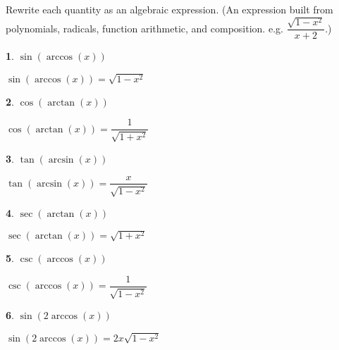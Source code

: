 \documentclass{amsbook}
\newtheorem{exc}{}
\newenvironment{ex}{\begin{exc}\normalfont}{\end{exc}}
\numberwithin{section}{chapter}
\numberwithin{equation}{chapter}
\begin{document}
Rewrite each quantity as an algebraic expression. (An expression built from polynomials, radicals, function arithmetic, and composition. e.g. $ \dfrac{\sqrt{1-x^2}}{x+2} $.)

\begin{multicols}{2}

\begin{ex}
	$\sin \left( \arccos \left( x \right) \right)$ 
	\begin{sol}
		$\sin \left( \arccos \left( x \right) \right) = \sqrt{1 - x^{2}}$ 
	\end{sol}
\end{ex}


\begin{ex}
	$\cos \left( \arctan \left( x \right) \right)$
	\begin{sol}
		$\cos \left( \arctan \left( x \right) \right) = \dfrac{1}{\sqrt{1 + x^{2}}}$
	\end{sol}
\end{ex}


\begin{ex}
	$\tan \left( \arcsin \left( x \right) \right)$ 
	\begin{sol}
		$\tan \left( \arcsin \left( x \right) \right) = \dfrac{x}{\sqrt{1 - x^{2}}}$ 
	\end{sol}
\end{ex}

\begin{ex}
	$\sec \left( \arctan \left( x \right) \right)$ 
	\begin{sol}
		$\sec \left( \arctan \left( x \right) \right) = \sqrt{1 + x^{2}}$ 
	\end{sol}
\end{ex}

 \begin{ex}
	$\csc \left( \arccos \left( x \right) \right)$ 
	\begin{sol}
		$\csc \left( \arccos \left( x \right) \right) = \dfrac{1}{\sqrt{1 - x^{2}}}$ 
	\end{sol}
\end{ex}
 

 \begin{ex}
 	$\sin \left( 2\arccos \left( x \right) \right)$
 	\begin{sol}
 		$\sin \left( 2\arccos \left( x \right) \right) = 2x\sqrt{1-x^2}$
 	\end{sol}
 \end{ex}

\end{multicols}
 
\end{document}
